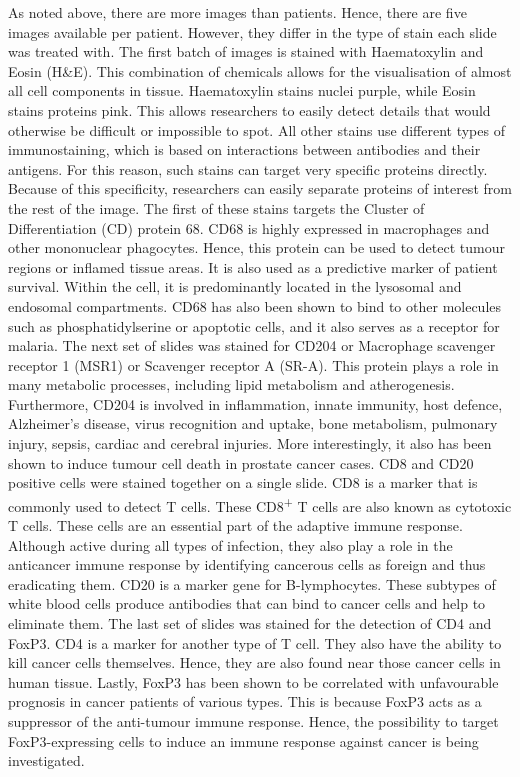 As noted above, there are more images than patients. Hence, there are five images available per patient. However, they differ in the type of stain each slide was treated with. The first batch of images is stained with Haematoxylin and Eosin (H\&E). This combination of chemicals allows for the visualisation of almost all cell components in tissue. Haematoxylin stains nuclei purple, while Eosin stains proteins pink. This allows researchers to easily detect details that would otherwise be difficult or impossible to spot. All other stains use different types of immunostaining, which is based on interactions between antibodies and their antigens. For this reason, such stains can target very specific proteins directly. Because of this specificity, researchers can easily separate proteins of interest from the rest of the image. The first of these stains targets the Cluster of Differentiation (CD) protein 68. CD68 is highly expressed in macrophages and other mononuclear phagocytes. Hence, this protein can be used to detect tumour regions or inflamed tissue areas. It is also used as a predictive marker of patient survival. Within the cell, it is predominantly located in the lysosomal and endosomal compartments. 
CD68 has also been shown to bind to other molecules such as phosphatidylserine or apoptotic cells, and it also serves as a receptor for malaria. \cite{Chistiakov2017CD68/macrosialin}
The next set of slides was stained for CD204 or Macrophage scavenger receptor 1 (MSR1) or Scavenger receptor A (SR-A). This protein plays a role in many metabolic processes, including lipid metabolism and atherogenesis. Furthermore, CD204 is involved in inflammation, innate immunity, host defence, Alzheimer’s disease, virus recognition and uptake, bone metabolism, pulmonary injury, sepsis, cardiac and cerebral injuries. \cite{Kelley2014Scavenger} More interestingly, it also has been shown to induce tumour cell death in prostate cancer cases. \cite{Yu2006CSR1, Zhu2008CSR1}
CD8 and CD20 positive cells were stained together on a single slide. CD8 is a marker that is commonly used to detect T cells. These CD8\textsuperscript{+} T cells are also known as cytotoxic T cells. These cells are an essential part of the adaptive immune response. Although active during all types of infection, they also play a role in the anticancer immune response by identifying cancerous cells as foreign and thus eradicating them. \cite{Raskov2020Cytotoxic, Oh2021Cytotoxic} CD20 is a marker gene for B-lymphocytes. These subtypes of white blood cells produce antibodies that can bind to cancer cells and help to eliminate them. \cite{Murphy2011Janeways} 
The last set of slides was stained for the detection of CD4 and FoxP3. CD4 is a marker for another type of T cell. They also have the ability to kill cancer cells themselves. Hence, they are also found near those cancer cells in human tissue. \cite{Oh2021Cytotoxic} Lastly, FoxP3 has been shown to be correlated with unfavourable prognosis in cancer patients of various types. \cite{Yang2017FOXP3} This is because FoxP3 acts as a suppressor of the anti-tumour immune response. Hence, the possibility to target FoxP3-expressing cells to induce an immune response against cancer is being investigated. \cite{Tanaka2016Regulatory}

